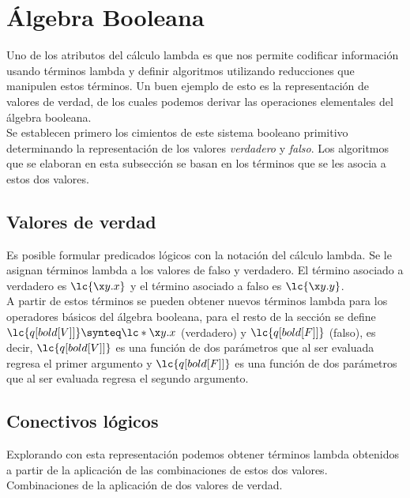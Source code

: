 \section{Álgebra Booleana}

Uno de los atributos del cálculo lambda es que nos permite codificar información usando términos lambda y definir algoritmos utilizando reducciones que manipulen estos términos. Un buen ejemplo de esto es la  representación de valores de verdad, de los cuales podemos derivar las operaciones elementales del álgebra booleana. \\

Se establecen primero los cimientos de este sistema booleano primitivo determinando la representación de los valores \emph{verdadero} y \emph{falso}. Los algoritmos que se elaboran en esta subsección se basan en los términos que se les asocia a estos dos valores. \\

\subsection{Valores de verdad}

Es posible formular predicados lógicos con la notación del cálculo lambda. Se le asignan términos lambda a los valores de falso y verdadero. El término asociado a verdadero es \(\lc{\x y.x}\) y el término asociado a falso es \(\lc{\x y.y}\). \\

A partir de estos términos se pueden obtener nuevos términos lambda para los operadores básicos del álgebra booleana, para el resto de la sección se define \(\lc{q[bold[V]]} \synteq \lc*{\x y.x}\) (verdadero) y \(\lc{q[bold[F]]}\) (falso), es decir, \(\lc{q[bold[V]]}\) es una función de dos parámetros que al ser evaluada regresa el primer argumento y \(\lc{q[bold[F]]}\) es una función de dos parámetros que al ser evaluada regresa el segundo argumento. \\

\subsection{Conectivos lógicos}

Explorando con esta representación podemos obtener términos lambda obtenidos a partir de la aplicación de las combinaciones de estos dos valores. \\

Combinaciones de la aplicación de dos valores de verdad. \\

